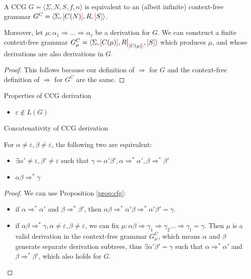 \documentclass[main.tex]{subfiles}
\begin{document}
\begin{prop}\label{prop:cfg}
    A CCG $G = \langle \Sigma, N, S, f, n \rangle$ is equivalent to an
    (albeit infinite) context-free grammar
    $G^C = \langle \Sigma, \textcolor{red}{[} C(N) \textcolor{red}{]}, R, \textcolor{red}{[} S \textcolor{red}{]} \rangle$.

    Moreover, let $\mu: \alpha_1 \Rightarrow ... \Rightarrow \alpha_r$
    be a derivation for $G$.
    We can construct a finite context-free grammar
    $G_\mu^C = \langle \Sigma, \lb C(\mu) \rb, \restr{R}{\lb C(\mu) \rb}, \lb S \rb \rangle$
    which produces $\mu$, and whose derivations are also derivations in $G$.
\end{prop}
\begin{proof}
    This follows because our definition of $\Rightarrow$ for $G$ and the context-free
    definition of $\Rightarrow$ for $G^C$ are the same.
\end{proof}

\begin{prop}
    Properties of CCG derivation
    \begin{itemize}
        \item $\varepsilon \notin L(G)$
    \end{itemize}
\end{prop}

\begin{prop}\label{prop:concat}
    Concatenativity of CCG derivation

    For $\alpha \neq \varepsilon, \beta \neq \varepsilon$, the following two are equivalent:
    \begin{itemize}

        \item $\exists \alpha' \neq \varepsilon, \beta' \neq \varepsilon$
            such that $\gamma = \alpha' \beta', \alpha \Rightarrow^* \alpha', \beta \Rightarrow^* \beta'$
        \item $\alpha \beta \Rightarrow^* \gamma$
    \end{itemize}
\end{prop}
\begin{proof}
    We can use Proposition \ref{prop:cfg}:

    \begin{itemize}
        \item if $\alpha \Rightarrow^* \alpha'$ and $\beta \Rightarrow^* \beta'$,
            then $\alpha \beta \Rightarrow^* \alpha' \beta \Rightarrow^* \alpha' \beta' = \gamma$.
        \item if $\alpha \beta \Rightarrow^* \gamma, \alpha \neq \varepsilon, \beta \neq \varepsilon$,
            we can fix $\mu: \alpha \beta \Rightarrow \gamma_1 \Rightarrow \gamma_2 ... \Rightarrow \gamma_t = \gamma$.
            Then $\mu$ is a valid derivation in the context-free grammar $G^C_{\mu}$,
            which means $\alpha$ and $\beta$ generate separate derivation
            subtrees, thus $\exists \alpha' \beta' = \gamma$ such that
            $\alpha \Rightarrow^* \alpha'$ and $\beta \Rightarrow^* \beta'$,
            which also holds for $G$.
    \end{itemize}
\end{proof}
\end{document}

